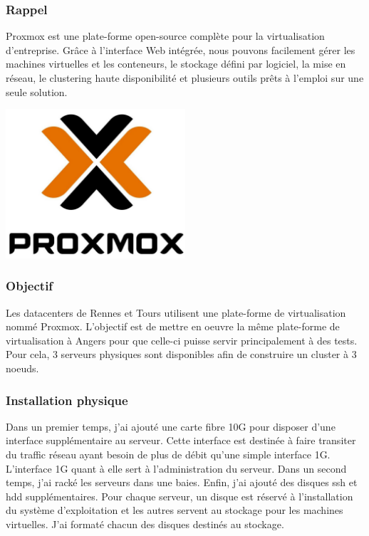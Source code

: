 \documentclass[12pt]{article}
\begin{document}
\subsubsection{Rappel}
\noindent%
\begin{minipage}{.7\textwidth}%
Proxmox est une plate-forme open-source complète pour la virtualisation d'entreprise. 
Grâce à l'interface Web intégrée, nous pouvons facilement gérer les machines virtuelles et les conteneurs, le stockage défini par logiciel, la mise en réseau, le clustering haute disponibilité et plusieurs outils prêts à l'emploi sur une seule solution.

\end{minipage}%
\hfill
\begin{minipage}{.3\textwidth}%
\begin{center}
\includegraphics[width=0.5\textwidth]{src/proxmox.JPG}
\end{center}
\end{minipage}%


\subsubsection{Objectif}
Les datacenters de Rennes et Tours utilisent une plate-forme de virtualisation nommé Proxmox. 
L'objectif est de mettre en oeuvre la même plate-forme de virtualisation à Angers pour que celle-ci puisse servir principalement à des tests. 
Pour cela, 3 serveurs physiques sont disponibles afin de construire un cluster à 3 noeuds.

\subsubsection{Installation physique}
Dans un premier temps, j'ai ajouté une carte fibre 10G pour disposer d'une interface supplémentaire au serveur. 
Cette interface est destinée à faire transiter du traffic réseau ayant besoin de plus de débit qu'une simple interface 1G. 
L'interface 1G quant à elle sert à l'administration du serveur.
Dans un second temps, j'ai racké les serveurs dans une baies. 
Enfin, j'ai ajouté des disques ssh et hdd supplémentaires.
Pour chaque serveur, un disque est réservé à l'installation du système d'exploitation et les autres servent au stockage pour les machines virtuelles.
J'ai formaté chacun des disques destinés au stockage.
\end{document}
